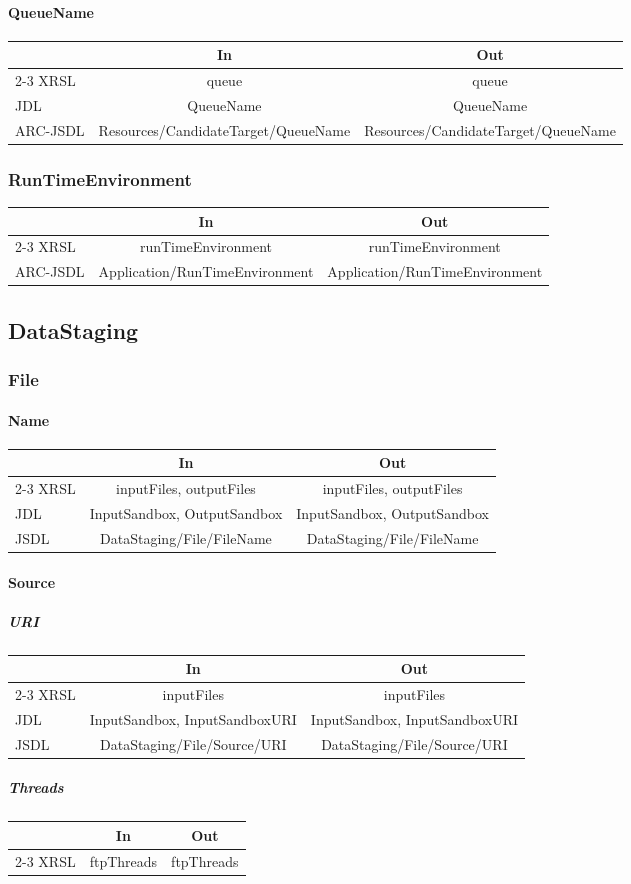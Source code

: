 \documentclass{article}
\newcommand{\subsubsubsection}[1]{\paragraph{#1}}
\newcommand{\subsubsubsubsection}[1]{\subparagraph{#1}}
\newenvironment{inouttabular}%
{\begin{center}\begin{tabular}{l>{\ttfamily\footnotesize}c>{\ttfamily\footnotesize}c}%
\toprule
& \textnormal{\normalsize{In}} & \textnormal{\normalsize{Out}}\\ \cmidrule{2-3}}
{\bottomrule\end{tabular}\end{center}}
\begin{document}
\subsubsubsection{QueueName}
\begin{inouttabular}
XRSL & queue & queue\\
JDL & QueueName & QueueName\\
ARC-JSDL & Resources/CandidateTarget/QueueName & Resources/CandidateTarget/QueueName\\
\end{inouttabular}

\subsubsection{RunTimeEnvironment}
\begin{inouttabular}
XRSL & runTimeEnvironment & runTimeEnvironment\\
ARC-JSDL & Application/RunTimeEnvironment & Application/RunTimeEnvironment\\
\end{inouttabular}

\subsection{DataStaging}
\subsubsection{File}
\subsubsubsection{Name}
\begin{inouttabular}
XRSL & inputFiles, outputFiles & inputFiles, outputFiles\\
JDL & InputSandbox, OutputSandbox & InputSandbox, OutputSandbox\\
JSDL & DataStaging/File/FileName & DataStaging/File/FileName\\
\end{inouttabular}

\subsubsubsection{Source}
\subsubsubsubsection{URI}
\begin{inouttabular}
XRSL & inputFiles & inputFiles\\
JDL & InputSandbox, InputSandboxURI & InputSandbox, InputSandboxURI\\
JSDL & DataStaging/File/Source/URI & DataStaging/File/Source/URI\\
\end{inouttabular}

\subsubsubsubsection{Threads}
\begin{inouttabular}
XRSL & ftpThreads & ftpThreads\\
\end{inouttabular}
\end{document}
